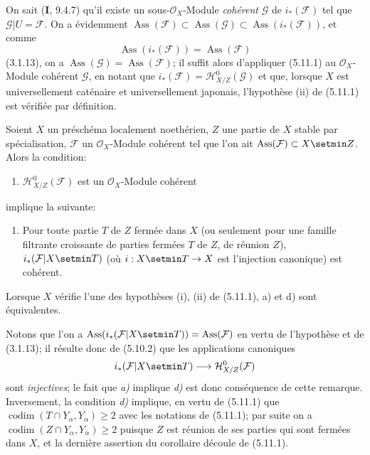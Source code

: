 On sait (\textbf{I}, 9.4.7) qu'il existe un sous-$\mathcal O_X$-Module \emph{cohérent}
$\mathcal G$ de $i_*(\mathcal F)$ tel que $\mathcal G\vert U=\mathcal F$. On a
évidemment
$\operatorname{Ass}(\mathcal F)\subset\operatorname{Ass}(\mathcal G)
\subset\operatorname{Ass}(i_*(\mathcal F))$, et comme
\[
\operatorname{Ass}(i_*(\mathcal F))=\operatorname{Ass}(\mathcal F)
\]
(3.1.13), on a $\operatorname{Ass}(\mathcal G)=\operatorname{Ass}(\mathcal F)$;
il suffit alors d'appliquer (5.11.1) au $\mathcal O_X$-Module cohérent
$\mathcal G$, en notant que $i_*(\mathcal F)=\mathcal H^0_{X/Z}(\mathcal G)$
et que, lorsque $X$ est universellement caténaire et universellement japonais,
l'hypothèse (ii) de (5.11.1) est vérifiée par définition.

\begin{corollary}[5.11.5]
\label{IV.2.s5.11.5-fr}
Soient $X$ un préschéma localement noethérien, $Z$ une partie de $X$ stable par
spécialisation, $\mathcal F$ un $\mathcal O_X$-Module cohérent tel que l'on ait
$\operatorname{Ass}(\mathcal F)\subset X\setmin Z$. Alors la condition:
\begin{enumerate}
\item[\textup{a)}] $\mathcal H^0_{X/Z}(\mathcal F)$ est un $\mathcal O_X$-Module
cohérent
\end{enumerate}
implique la suivante:
\begin{enumerate}
\item[\textup{d)}] Pour toute partie $T$ de $Z$ fermée dans $X$ \textup{(ou seulement pour une}
famille filtrante
croissante \textup{de parties fermées $T$ de $Z$, de réunion $Z$)},
$i_*(\mathcal F\vert X\setmin T)$ (où $i:X\setmin T\to X$ est l'injection canonique) est
cohérent.
\end{enumerate}
Lorsque $X$ vérifie l'une des hypothèses \textup{(i), (ii)} de \textup{(5.11.1), a)} et \textup{d)} sont
équivalentes.
\end{corollary}

Notons que l'on a
$\operatorname{Ass}(i_*(\mathcal F\vert X\setmin T))=\operatorname{Ass}(\mathcal F)$
en vertu de l'hypothèse et de (3.1.13); il résulte donc de (5.10.2) que les
applications canoniques
\[
i_*(\mathcal F\vert X\setmin T)\longrightarrow\mathcal H^0_{X/Z}(\mathcal F)
\]
sont \emph{injectives}; le fait que \emph{a)} implique \emph{d)} est donc conséquence de cette
remarque. Inversement, la condition \emph{d)} implique, en vertu de (5.11.1) que
$\operatorname{codim}(T\cap Y_\alpha,Y_\alpha)\geq2$ avec les notations de
(5.11.1); par suite on a
$\operatorname{codim}(Z\cap Y_\alpha,Y_\alpha)\geq2$ puisque $Z$ est réunion
de ses parties qui sont fermées dans $X$, et la dernière assertion du
corollaire découle de (5.11.1).

